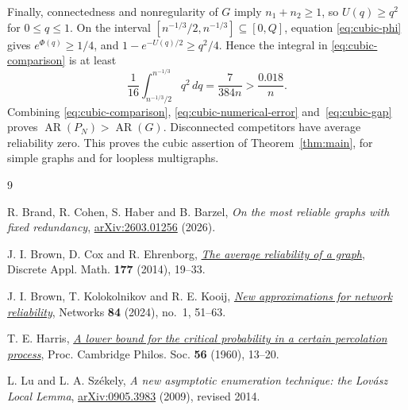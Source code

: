 \documentclass[11pt,reqno]{amsart}
\theoremstyle{remark}
\numberwithin{equation}{section}
\newcommand{\AR}{\operatorname{AR}}
\begin{document}
Finally, connectedness and nonregularity of $G$ imply $n_1+n_2\ge1$,
so $U(q)\ge q^2$ for $0\le q\le1$. On the interval
$[n^{-1/3}/2,n^{-1/3}]\subseteq[0,Q]$, equation
\eqref{eq:cubic-phi} gives $e^{\Phi(q)}\ge1/4$, and
$1-e^{-U(q)/2}\ge q^2/4$. Hence the integral in
\eqref{eq:cubic-comparison} is at least
\begin{equation}\label{eq:cubic-gap}
 \frac1{16}\int_{n^{-1/3}/2}^{n^{-1/3}}q^2\,dq
 =\frac7{384n}>\frac{0.018}{n}.
\end{equation}
Combining \eqref{eq:cubic-comparison}, \eqref{eq:cubic-numerical-error}
and~\eqref{eq:cubic-gap} proves $\AR(P_N)>\AR(G)$. Disconnected
competitors have average reliability zero. This proves the cubic
assertion of Theorem~\ref{thm:main}, for simple graphs and for
loopless multigraphs.

\begin{thebibliography}{9}

R. Brand, R. Cohen, S. Haber and B. Barzel,
\emph{On the most reliable graphs with fixed redundancy},
\href{https://arxiv.org/abs/2603.01256}{arXiv:2603.01256} (2026).

J. I. Brown, D. Cox and R. Ehrenborg,
\href{https://doi.org/10.1016/j.dam.2014.05.048}{\emph{The average reliability of a graph}},
Discrete Appl. Math. \textbf{177} (2014), 19--33.

J. I. Brown, T. Kolokolnikov and R. E. Kooij,
\href{https://doi.org/10.1002/net.22215}{\emph{New approximations for network reliability}},
Networks \textbf{84} (2024), no.~1, 51--63.

T. E. Harris,
\href{https://doi.org/10.1017/S0305004100034241}{\emph{A lower bound for the critical probability in a certain percolation process}},
Proc. Cambridge Philos. Soc. \textbf{56} (1960), 13--20.

L. Lu and L. A. Sz\'ekely,
\emph{A new asymptotic enumeration technique: the Lov\'asz Local Lemma},
\href{https://arxiv.org/abs/0905.3983}{arXiv:0905.3983} (2009), revised 2014.

\end{thebibliography}
\end{document}
